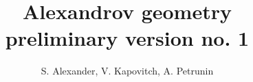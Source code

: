\frontmatter
\title{Alexandrov geometry\\
{\large preliminary version no. 1}}
\date{}
\author{S. Alexander, V. Kapovitch, A. Petrunin}
\maketitle
